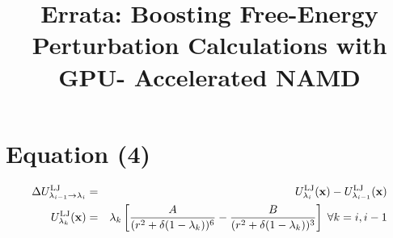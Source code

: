 \documentclass[]{article}
\title{Errata: Boosting Free-Energy Perturbation Calculations with GPU- 
Accelerated NAMD}
\begin{document}
\maketitle

\section{Equation (4)}

\begin{eqnarray}\label{eq:lj_scaling}
\Delta U_{\lambda_{i-1}\rightarrow \lambda_{i}}^{\rm LJ} & = & 
U_{\lambda_{i}}^{\rm LJ}(\mathbf{x})-U_{\lambda_{i-1}}^{\rm 
LJ}(\mathbf{x})\nonumber\\
U_{\lambda_k}^{\rm LJ}(\mathbf{x}) & = & \displaystyle 
\lambda_k\left[\frac{A}{(r^2+\delta(1-\lambda_k))^6}-\frac{B}{(r^2+\delta(1-\lambda_k))^3}\right]\;\forall
 k=i, i-1\nonumber
\end{eqnarray}
\end{document}

